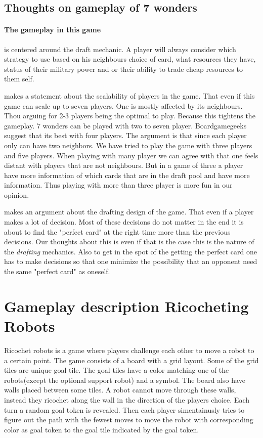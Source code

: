 \documentclass[a4paper]{article}
\begin{document}
\subsection{Thoughts on gameplay of 7 wonders}
\label{sec:thoughtsGP7wond}
\paragraph{The gameplay in this game} is centered around the draft mechanic. A player will always consider which strategy to use based on his neighbours choice of card, what resources they have, status of their military power and or their ability to trade cheap resources to them self. 

\citeauthor{critical7wond} makes a statement about the scalability of players in the game. That even if this game can scale up to seven players. One is mostly affected by its neighbours. Thou arguing for 2-3 players being the optimal to play. Because this tightens the gameplay. 
7 wonders can be played with two to seven player. Boardgamegeeks suggest that its best with four players. The argument is that since each player only can have two neighbors. We have tried to play the game with three players and five players. When playing with many player we can agree with \citeauthor{critical7wond} that one feels distant with players that are not neighbours. But in a game of three a player have more information of which cards that are in the draft pool and have more information. Thus playing with more than three player is more fun in our opinion.

\citeauthor{opiogamers7wond} makes an argument about the drafting design of the game. That even if a player makes a lot of decision. Most of these decisions do not matter in the end it is about to find the "perfect card" at the right time more than the previous decisions. Our thoughts about this is even if that is the case this is the nature of the \textit{drafting} mechanics. Also to get in the spot of the getting the perfect card one has to make decisions so that one minimize the possibility that an opponent need the same "perfect card" as oneself.



\section{Gameplay description Ricocheting Robots}
Ricochet robots is a game where players challenge each other to move a robot to a certain point. The game consists of a board with a grid layout. Some of the grid tiles are unique goal tile. The goal tiles have a color matching one of the robots(except the optional support robot) and a symbol. The board also have walls placed between some tiles. A robot cannot move through these walls, instead they ricochet along the wall in the direction of the players choice. Each turn a random goal token is revealed. Then each player simentainusly tries to figure out the path with the fewest moves to move the robot with corresponding color as goal token to the goal tile indicated by the goal token. 
\end{document}
